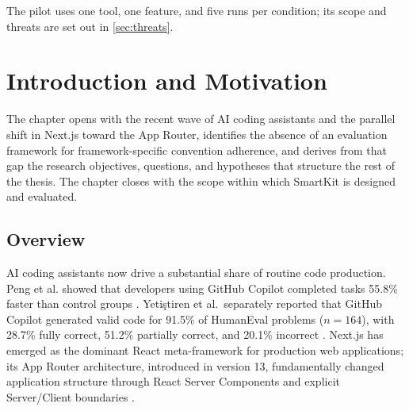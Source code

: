 \documentclass[12pt,a4paper]{report}
\begin{document}
The pilot uses one tool, one feature, and five runs per condition; its scope and threats are set out in \autoref{sec:threats}.

\clearpage

\tableofcontents

\clearpage

\listoffigures
\thispagestyle{preliminary}

\clearpage

\listoftables
\thispagestyle{preliminary}

\clearpage


\pagestyle{fancy}


\chapter{Introduction and Motivation}
\label{sec:introduction}

The chapter opens with the recent wave of AI coding assistants and the parallel shift in Next.js toward the App Router, identifies the absence of an evaluation framework for framework-specific convention adherence, and derives from that gap the research objectives, questions, and hypotheses that structure the rest of the thesis. The chapter closes with the scope within which SmartKit is designed and evaluated.

\section{Overview}

AI coding assistants now drive a substantial share of routine code production. Peng et al. showed that developers using GitHub Copilot completed tasks 55.8\% faster than control groups \parencite{peng2023impact}. Yetiştiren et al.\ separately reported that GitHub Copilot generated valid code for 91.5\% of HumanEval problems ($n=164$), with 28.7\% fully correct, 51.2\% partially correct, and 20.1\% incorrect \parencite{yetistiren2022assessing}. Next.js has emerged as the dominant React meta-framework for production web applications; its App Router architecture, introduced in version 13, fundamentally changed application structure through React Server Components and explicit Server/Client boundaries \parencite{nextjsdocs}.
\end{document}

